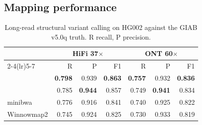 \subsection{Mapping performance}
\label{sec:res-perf}

\newcommand{\pend}{\textcolor{orange!80!black}{\textbf{pending}}}
\begin{table}[b]
\caption{Long-read structural variant calling on HG002 against the GIAB v5.0q truth. R recall, P precision.}
\label{tab:sv}
\footnotesize
\setlength{\tabcolsep}{2pt}
\begin{tabular*}{\columnwidth}{@{\extracolsep{\fill}}lrrrrrr@{}}
\toprule
 & \multicolumn{3}{c}{HiFi 37$\times$} & \multicolumn{3}{c}{ONT 60$\times$}\\
\cmidrule(lr){2-4}\cmidrule(lr){5-7}
 & R & P & F1 & R & P & F1\\
\midrule
\flash{} & \textbf{0.798} & 0.939 & \textbf{0.863} & \textbf{0.757} & 0.932 & \textbf{0.836}\\
\mmtwo{} & 0.785 & \textbf{0.944} & 0.857 & 0.749 & \textbf{0.941} & 0.834\\
minibwa & 0.776 & 0.916 & 0.841 & 0.740 & 0.925 & 0.822\\
Winnowmap2 & 0.745 & 0.924 & 0.825 & 0.730 & 0.933 & 0.819\\
\bottomrule
\end{tabular*}
\end{table}

